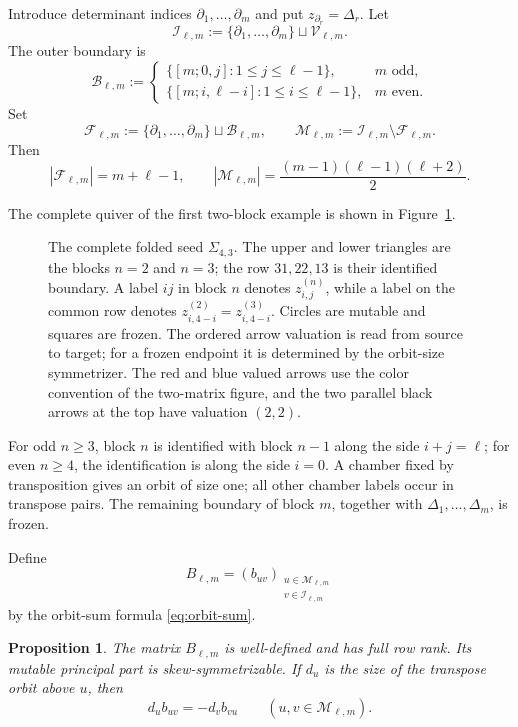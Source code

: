 \documentclass[11pt]{amsart}
\newtheorem{proposition}[theorem]{Proposition}
\theoremstyle{definition}
\theoremstyle{remark}
\begin{document}
Introduce determinant indices $\partial_1,\ldots,\partial_m$ and put
$z_{\partial_r}=\Delta_r$.  Let
\[ \mathscr I_{\ell,m} :=\{\partial_1,\ldots,\partial_m\}\sqcup\mathscr V_{\ell,m}. \]
The outer boundary is
\begin{equation*}
\mathscr B_{\ell,m}:=
 \begin{cases}
  \{[m;0,j]:1\le j\le\ell-1\},&m\text{ odd},\\
  \{[m;i,\ell-i]:1\le i\le\ell-1\},&m\text{ even}.
 \end{cases}
\end{equation*}
Set
\[ \mathscr F_{\ell,m} :=\{\partial_1,\ldots,\partial_m\}\sqcup\mathscr B_{\ell,m}, \qquad \mathscr M_{\ell,m}:=\mathscr I_{\ell,m}\setminus\mathscr F_{\ell,m}. \]
Then
\[ |\mathscr F_{\ell,m}|=m+\ell-1, \qquad |\mathscr M_{\ell,m}| =\frac{(m-1)(\ell-1)(\ell+2)}2. \]

The complete quiver of the first two-block example is shown in
Figure~\ref{fig:seed-43}.

\begin{figure}[t]
\centering
\Symfourthree
\caption{The complete folded seed $\Sigma_{4,3}$.  The upper and lower
triangles are the blocks $n=2$ and $n=3$; the row $31,22,13$ is their
identified boundary.  A label $ij$ in block $n$ denotes
$z_{i,j}^{(n)}$, while a label on the common row denotes
$z_{i,4-i}^{(2)}=z_{i,4-i}^{(3)}$.  Circles are mutable and squares are
frozen.  The ordered arrow valuation is read from source to target; for a
frozen endpoint it is determined by the orbit-size symmetrizer.  The red
and blue valued arrows use the color convention of the two-matrix figure,
and the two parallel black arrows at the top have valuation $(2,2)$.}
\label{fig:seed-43}
\end{figure}

For odd $n\ge3$, block $n$ is identified with block $n-1$ along the side
$i+j=\ell$; for even $n\ge4$, the identification is along the side $i=0$.
A chamber fixed by transposition gives an orbit of size one; all other
chamber labels occur in transpose pairs.  The remaining boundary of block
$m$, together with $\Delta_1,\ldots,\Delta_m$, is frozen.

Define
\[ B_{\ell,m}=(b_{uv})_{ \substack{u\in\mathscr M_{\ell,m}\\v\in\mathscr I_{\ell,m}}} \]
by the orbit-sum formula \eqref{eq:orbit-sum}.

\begin{proposition}
\label{prop:folded-B}
The matrix $B_{\ell,m}$ is well-defined and has full row rank.  Its mutable
principal part is skew-symmetrizable.  If $d_u$ is the size
of the transpose orbit above $u$, then
\begin{equation}
 d_ub_{uv}=-d_vb_{vu}
 \qquad(u,v\in\mathscr M_{\ell,m}).
 \label{eq:symmetrizer}
\end{equation}
\end{proposition}
\end{document}

